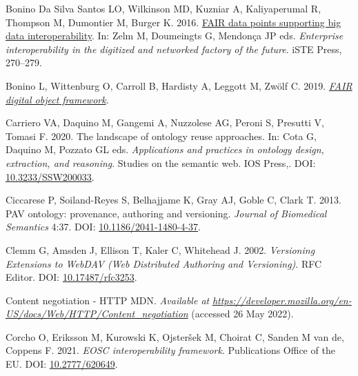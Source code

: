 \begin{CSLReferences}{1}{0}
\leavevmode{}%
Bonino Da Silva Santos LO, Wilkinson MD, Kuzniar A, Kaliyaperumal R, Thompson M, Dumontier M, Burger K. 2016. \href{https://www.researchgate.net/publication/\%7B309468587/_FAIR/_Data/_Points/_Supporting/_Big/_Data/_Interoperability\%7D}{FAIR data points supporting big data interoperability}. In: Zelm M, Doumeingts G, Mendonça JP eds. \emph{Enterprise interoperability in the digitized and networked factory of the future}. iSTE Press, 270--279.

\leavevmode{}%
Bonino L, Wittenburg O, Carroll B, Hardisty A, Leggott M, Zwölf C. 2019. \emph{\href{https://github.com/GEDE-RDA-Europe/GEDE/blob/master/FAIR\%20Digital\%20Objects/FDOF/FAIR\%20Digital\%20Object\%20Framework-v1-02.docx}{FAIR digital object framework}}.

\leavevmode{}%
Carriero VA, Daquino M, Gangemi A, Nuzzolese AG, Peroni S, Presutti V, Tomasi F. 2020. The landscape of ontology reuse approaches. In: Cota G, Daquino M, Pozzato GL eds. \emph{Applications and practices in ontology design, extraction, and reasoning}. Studies on the semantic web. IOS Press,. DOI: \href{https://doi.org/10.3233/SSW200033}{10.3233/SSW200033}.

\leavevmode{}%
Ciccarese P, Soiland-Reyes S, Belhajjame K, Gray AJ, Goble C, Clark T. 2013. PAV ontology: provenance, authoring and versioning. \emph{Journal of Biomedical Semantics} 4:37. DOI: \href{https://doi.org/10.1186/2041-1480-4-37}{10.1186/2041-1480-4-37}.

\leavevmode{}%
Clemm G, Amsden J, Ellison T, Kaler C, Whitehead J. 2002. \emph{Versioning Extensions to WebDAV (Web Distributed Authoring and Versioning)}. RFC Editor. DOI: \href{https://doi.org/10.17487/rfc3253}{10.17487/rfc3253}.

\leavevmode{}%
Content negotiation - HTTP \textbar{} MDN. \emph{Available at} \href{https://developer.mozilla.org/en-US/docs/Web/HTTP/Content_negotiation}{\emph{https://developer.mozilla.org/en-US/docs/Web/HTTP/Content\_negotiation}} (accessed 26 May 2022).

\leavevmode{}%
Corcho O, Eriksson M, Kurowski K, Ojsteršek M, Choirat C, Sanden M van de, Coppens F. 2021. \emph{EOSC interoperability framework}. Publications Office of the EU. DOI: \href{https://doi.org/10.2777/620649}{10.2777/620649}.


\end{CSLReferences}
